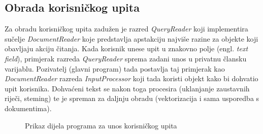 \documentclass[times, utf8, zavrsni, numeric]{fer}
\begin{document}
\subsection{Obrada korisničkog upita}
Za obradu korisničkog upita zadužen je razred \textit{QueryReader} koji implementira sučelje \textit{DocumentReader} koje predstavlja apstakciju najviše razine za objekte koji obavljaju akciju čitanja. Kada korisnik unese upit u znakovno polje (engl. \textit{text field}), primjerak razreda \textit{QueryReader} sprema zadani unos u privatnu člansku varijablu. Pozivatelj (glavni program) tada postavlja taj primjerak kao \textit{DocumentReader} razreda \textit{InputProcessor} koji tada koristi objekt kako bi dohvatio upit korisnika. Dohvaćeni tekst se nakon toga procesira (uklanjanje zaustavnih riječi, steming) te je spreman za daljnju obradu (vektorizacija i sama usporedba s dokumentima).
\begin{figure}
\caption{Prikaz dijela programa za unos korisničkog upita}
\label{img:query_search}
\end{figure}
\end{document}
